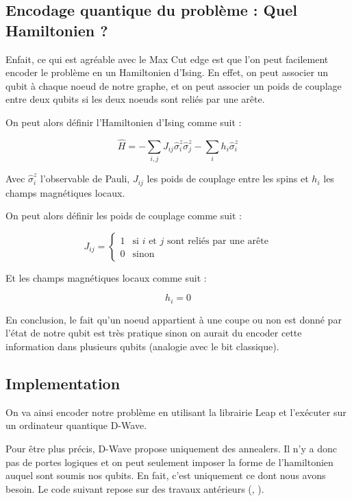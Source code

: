 \documentclass{article}
\begin{document}
\begin{multicols}{2}
\subsection{Encodage quantique du problème : Quel Hamiltonien ?}

Enfait, ce qui est agréable avec le Max Cut edge est que l'on peut facilement encoder le problème en un Hamiltonien d'Ising.
En effet, on peut associer un qubit à chaque noeud de notre graphe, et on peut associer un poids de couplage entre deux qubits si les deux noeuds sont reliés par une arête.

On peut alors définir l'Hamiltonien d'Ising comme suit :

\begin{equation}
    \hat{H} = -\sum_{i,j} J_{ij}\hat{\sigma}_i^z\hat{\sigma}_j^z - \sum_i h_i\hat{\sigma}_i^z
\end{equation}

Avec $\hat{\sigma}_i^z$ l'observable de Pauli, $J_{ij}$ les poids de couplage entre les spins et $h_i$ les champs magnétiques locaux.

On peut alors définir les poids de couplage comme suit :

\begin{equation}
    J_{ij} = \begin{cases} 1 & \text{si } i \text{ et } j \text{ sont reliés par une arête} \\ 0 & \text{sinon} \end{cases}
\end{equation}

Et les champs magnétiques locaux comme suit :

\begin{equation}
    h_i = 0
\end{equation}

En conclusion, le fait qu'un noeud appartient à une coupe ou non est donné par l'état de notre qubit est très pratique sinon on aurait du encoder cette information dans plusieurs qubits (analogie avec le bit classique).

\subsection{Implementation}


On va ainsi encoder notre problème en utilisant la librairie Leap et l'exécuter sur un ordinateur quantique D-Wave.

Pour être plus précis, D-Wave propose uniquement des annealers. Il n'y a donc pas de portes logiques et on peut seulement imposer la forme de l'hamiltonien auquel sont soumis nos qubits.
En fait, c'est uniquement ce dont nous avons besoin. Le code suivant repose sur des travaux antérieurs (\cite{jain_solving_2021}, \cite{stechly_mstechlyquantum_tsp_tutorials_2024}).


\end{multicols}
\end{document}
